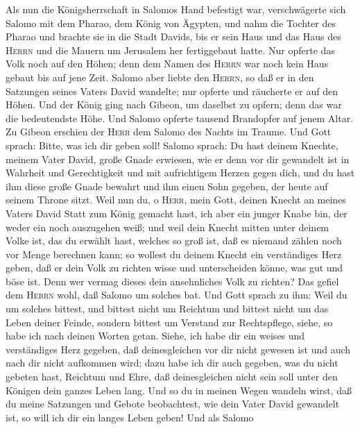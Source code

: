  Als nun die Königsherrschaft in Salomos Hand befestigt
war, verschwägerte sich Salomo mit dem Pharao, dem König von Ägypten,
und nahm die Tochter des Pharao und brachte sie in die Stadt Davids, bis
er sein Haus und das Haus des \textsc{Herrn} und die Mauern um Jerusalem
her fertiggebaut hatte.  Nur opferte das Volk noch auf den
Höhen; denn dem Namen des \textsc{Herrn} war noch kein Haus gebaut bis
auf jene Zeit.  Salomo aber liebte den \textsc{Herrn}, so
daß er in den Satzungen seines Vaters David wandelte; nur opferte und
räucherte er auf den Höhen.  Und der König ging nach
Gibeon, um daselbst zu opfern; denn das war die bedeutendste Höhe. Und
Salomo opferte tausend Brandopfer auf jenem Altar.  Zu
Gibeon erschien der \textsc{Herr} dem Salomo des Nachts im Traume. Und
Gott sprach: Bitte, was ich dir geben soll!  Salomo
sprach: Du hast deinem Knechte, meinem Vater David, große Gnade
erwiesen, wie er denn vor dir gewandelt ist in Wahrheit und
Gerechtigkeit und mit aufrichtigem Herzen gegen dich, und du hast ihm
diese große Gnade bewahrt und ihm einen Sohn gegeben, der heute auf
seinem Throne sitzt.  Weil nun du, o \textsc{Herr}, mein
Gott, deinen Knecht an meines Vaters David Statt zum König gemacht hast,
ich aber ein junger Knabe bin, der weder ein noch auszugehen weiß;
 und weil dein Knecht mitten unter deinem Volke ist, das
du erwählt hast, welches so groß ist, daß es niemand zählen noch vor
Menge berechnen kann;  so wollest du deinem Knecht ein
verständiges Herz geben, daß er dein Volk zu richten wisse und
unterscheiden könne, was gut und böse ist. Denn wer vermag dieses dein
ansehnliches Volk zu richten?  Das gefiel dem
\textsc{Herrn} wohl, daß Salomo um solches bat.  Und Gott
sprach zu ihm: Weil du um solches bittest, und bittest nicht um Reichtum
und bittest nicht um das Leben deiner Feinde, sondern bittest um
Verstand zur Rechtspflege,  siehe, so habe ich nach
deinen Worten getan. Siehe, ich habe dir ein weises und verständiges
Herz gegeben, daß deinesgleichen vor dir nicht gewesen ist und auch nach
dir nicht aufkommen wird;  dazu habe ich dir auch
gegeben, was du nicht gebeten hast, Reichtum und Ehre, daß
deinesgleichen nicht sein soll unter den Königen dein ganzes Leben lang.
 Und so du in meinen Wegen wandeln wirst, daß du meine
Satzungen und Gebote beobachtest, wie dein Vater David gewandelt ist, so
will ich dir ein langes Leben geben!  Und als Salomo
